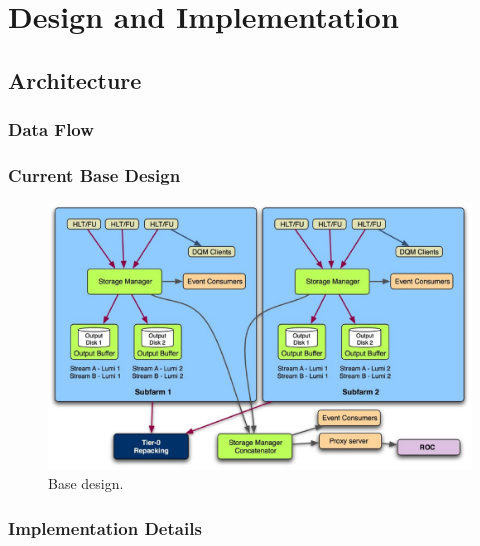 \section{Design and Implementation}

\subsection{Architecture}

\subsubsection{Data Flow}

\subsubsection{Current Base Design}

\begin{figure}[hbtp]
  \begin{center}
    \includegraphics[width=5.5in]{SM_architecture_base.eps}
    \caption{Base design.}
    \label{fig:base_design}
  \end{center}
\end{figure}

\subsubsection{Implementation Details}


